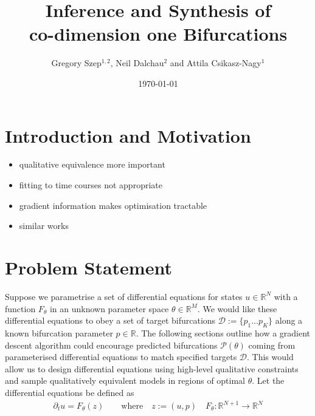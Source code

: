 \documentclass{article}[12pt]
\numberwithin{equation}{section}
\begin{document}
\title{
	Inference and Synthesis of\\
	co-dimension one Bifurcations
}

\author{Gregory Szep$^{1,2}$, Neil Dalchau$^2$ and Attila Csikasz-Nagy$^1$}
\date{\today}
\maketitle
\vspace{-25pt}
\section{Introduction and Motivation}

\begin{itemize}
\item qualitative equivalence more important
\item fitting to time courses not appropriate
\item gradient information makes optimisation tractable
\item similar works
\end{itemize}

\clearpage
\section{Problem Statement}
Suppose we parametrise a set of differential equations for states $u\in\mathbb{R}^N$ with a function $F_{\theta}$ in an unknown parameter space $\theta\in\mathbb{R}^M$. We would like these differential equations to obey 
a set of target bifurcations $\mathcal{D}:=\{p_1\dots p_K\}$ along a known bifurcation parameter $p\in\mathbb{R}$. The following sections outline how a gradient descent algorithm could encourage predicted bifurcations $\mathcal{P}(\theta)$ coming from parameterised differential equations to match specified targets $\mathcal{D}$. This would allow us to design differential equations using high-level qualitative constraints and sample qualitatively equivalent models in regions of optimal $\theta$. Let the differential equations be defined as
\begin{align}
	\partial_t u=F_{\theta}(z)
	\qquad\mathrm{where}\quad z:=(u,p)\quad
	F_{\theta} : \mathbb{R}^{N+1}\rightarrow\mathbb{R}^N
\end{align}
\end{document}
